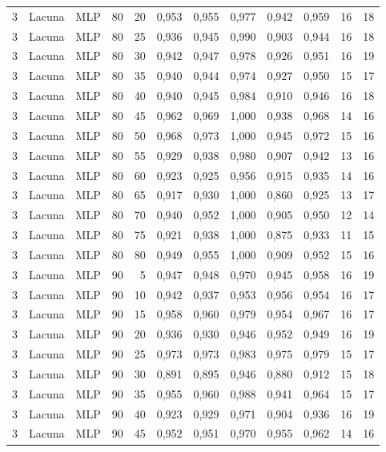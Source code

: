 \begin{longtable}{@{}rllrrrrrrrrr@{}}
3 & Lacuna & MLP & 80 & 20 & 0,953 & 0,955 & 0,977 & 0,942 & 0,959 & 16 & 18 \\
3 & Lacuna & MLP & 80 & 25 & 0,936 & 0,945 & 0,990 & 0,903 & 0,944 & 16 & 18 \\
3 & Lacuna & MLP & 80 & 30 & 0,942 & 0,947 & 0,978 & 0,926 & 0,951 & 16 & 19 \\
3 & Lacuna & MLP & 80 & 35 & 0,940 & 0,944 & 0,974 & 0,927 & 0,950 & 15 & 17 \\
3 & Lacuna & MLP & 80 & 40 & 0,940 & 0,945 & 0,984 & 0,910 & 0,946 & 16 & 18 \\
3 & Lacuna & MLP & 80 & 45 & 0,962 & 0,969 & 1,000 & 0,938 & 0,968 & 14 & 16 \\
3 & Lacuna & MLP & 80 & 50 & 0,968 & 0,973 & 1,000 & 0,945 & 0,972 & 15 & 16 \\
3 & Lacuna & MLP & 80 & 55 & 0,929 & 0,938 & 0,980 & 0,907 & 0,942 & 13 & 16 \\
3 & Lacuna & MLP & 80 & 60 & 0,923 & 0,925 & 0,956 & 0,915 & 0,935 & 14 & 16 \\
3 & Lacuna & MLP & 80 & 65 & 0,917 & 0,930 & 1,000 & 0,860 & 0,925 & 13 & 17 \\
3 & Lacuna & MLP & 80 & 70 & 0,940 & 0,952 & 1,000 & 0,905 & 0,950 & 12 & 14 \\
3 & Lacuna & MLP & 80 & 75 & 0,921 & 0,938 & 1,000 & 0,875 & 0,933 & 11 & 15 \\
3 & Lacuna & MLP & 80 & 80 & 0,949 & 0,955 & 1,000 & 0,909 & 0,952 & 15 & 16 \\
3 & Lacuna & MLP & 90 & 5 & 0,947 & 0,948 & 0,970 & 0,945 & 0,958 & 16 & 19 \\
3 & Lacuna & MLP & 90 & 10 & 0,942 & 0,937 & 0,953 & 0,956 & 0,954 & 16 & 17 \\
3 & Lacuna & MLP & 90 & 15 & 0,958 & 0,960 & 0,979 & 0,954 & 0,967 & 16 & 17 \\
3 & Lacuna & MLP & 90 & 20 & 0,936 & 0,930 & 0,946 & 0,952 & 0,949 & 16 & 19 \\
3 & Lacuna & MLP & 90 & 25 & 0,973 & 0,973 & 0,983 & 0,975 & 0,979 & 15 & 17 \\
3 & Lacuna & MLP & 90 & 30 & 0,891 & 0,895 & 0,946 & 0,880 & 0,912 & 15 & 18 \\
3 & Lacuna & MLP & 90 & 35 & 0,955 & 0,960 & 0,988 & 0,941 & 0,964 & 15 & 17 \\
3 & Lacuna & MLP & 90 & 40 & 0,923 & 0,929 & 0,971 & 0,904 & 0,936 & 16 & 19 \\
3 & Lacuna & MLP & 90 & 45 & 0,952 & 0,951 & 0,970 & 0,955 & 0,962 & 14 & 16 \\

\end{longtable}

